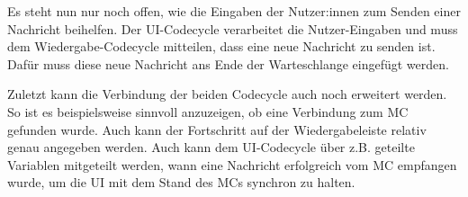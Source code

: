 Es steht nun nur noch offen, wie die Eingaben der Nutzer:innen zum Senden einer Nachricht beihelfen.
Der UI-Codecycle verarbeitet die Nutzer-Eingaben und muss dem Wiedergabe-Codecycle mitteilen, dass eine neue Nachricht zu senden ist.
Dafür muss diese neue Nachricht ans Ende der Warteschlange eingefügt werden.

Zuletzt kann die Verbindung der beiden Codecycle auch noch erweitert werden.
So ist es beispielsweise sinnvoll anzuzeigen, ob eine Verbindung zum \ac{MC} gefunden wurde.
Auch kann der Fortschritt auf der Wiedergabeleiste relativ genau angegeben werden.
Auch kann dem UI-Codecycle über z.B. geteilte Variablen mitgeteilt werden, wann eine Nachricht erfolgreich vom \ac{MC} empfangen wurde, um die \ac{UI} mit dem Stand des \ac{MC}s synchron zu halten.

